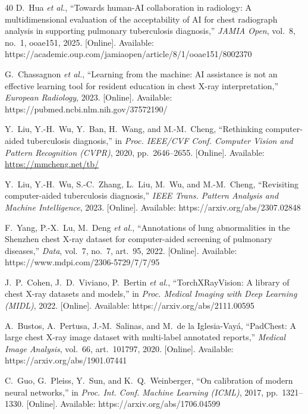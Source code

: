 \documentclass[conference, letterpaper]{IEEEtran}
\begin{document}
\begin{thebibliography}{40}
D.~Hua \textit{et al.}, ``Towards human-AI collaboration in radiology: A multidimensional evaluation of the acceptability of AI for chest radiograph analysis in supporting pulmonary tuberculosis diagnosis,'' \textit{JAMIA Open}, vol.~8, no.~1, ooae151, 2025. [Online]. Available: https://academic.oup.com/jamiaopen/article/8/1/ooae151/8002370

G.~Chassagnon \textit{et al.}, ``Learning from the machine: AI assistance is not an effective learning tool for resident education in chest X-ray interpretation,'' \textit{European Radiology}, 2023. [Online]. Available: https://pubmed.ncbi.nlm.nih.gov/37572190/

Y.~Liu, Y.-H.~Wu, Y.~Ban, H.~Wang, and M.-M.~Cheng, ``Rethinking computer-aided tuberculosis diagnosis,'' in \textit{Proc. IEEE/CVF Conf. Computer Vision and Pattern Recognition (CVPR)}, 2020, pp.~2646--2655. [Online]. Available: \url{https://mmcheng.net/tb/}

Y.~Liu, Y.-H.~Wu, S.-C.~Zhang, L.~Liu, M.~Wu, and M.-M.~Cheng, ``Revisiting computer-aided tuberculosis diagnosis,'' \textit{IEEE Trans. Pattern Analysis and Machine Intelligence}, 2023. [Online]. Available: https://arxiv.org/abs/2307.02848

F.~Yang, P.-X.~Lu, M.~Deng \textit{et al.}, ``Annotations of lung abnormalities in the Shenzhen chest X-ray dataset for computer-aided screening of pulmonary diseases,'' \textit{Data}, vol.~7, no.~7, art.~95, 2022. [Online]. Available: https://www.mdpi.com/2306-5729/7/7/95

J.~P.~Cohen, J.~D.~Viviano, P.~Bertin \textit{et al.}, ``TorchXRayVision: A library of chest X-ray datasets and models,'' in \textit{Proc. Medical Imaging with Deep Learning (MIDL)}, 2022. [Online]. Available: https://arxiv.org/abs/2111.00595

A.~Bustos, A.~Pertusa, J.-M.~Salinas, and M.~de la Iglesia-Vay\'{a}, ``PadChest: A large chest X-ray image dataset with multi-label annotated reports,'' \textit{Medical Image Analysis}, vol.~66, art.~101797, 2020. [Online]. Available: https://arxiv.org/abs/1901.07441

C.~Guo, G.~Pleiss, Y.~Sun, and K.~Q.~Weinberger, ``On calibration of modern neural networks,'' in \textit{Proc. Int. Conf. Machine Learning (ICML)}, 2017, pp.~1321--1330. [Online]. Available: https://arxiv.org/abs/1706.04599


\end{thebibliography}
\end{document}
